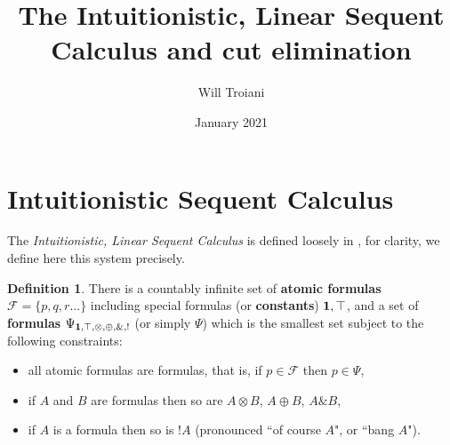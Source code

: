 \documentclass[12pt]{article}
\title{The Intuitionistic, Linear Sequent Calculus and cut elimination}
\author{Will Troiani}
\date{January 2021}
\theoremstyle{plain}
\theoremstyle{definition}
\newtheorem{defn}[thm]{Definition} %
\newcommand{\scr}[1]{\mathscr{#1}}
\begin{document}
\maketitle
\tableofcontents

\section{Intuitionistic Sequent Calculus}\label{Sec:intuitionistic_linear_sequent_calculus}
The \emph{Intuitionistic, Linear Sequent Calculus} is defined loosely in \cite[\S 11.1.2]{blind}, for clarity, we define here this system precisely.

\begin{defn}
There is a countably infinite set of \textbf{atomic formulas} $\scr{F} = \lbrace p,q,r\hdots \rbrace$ including special formulas (or \textbf{constants}) $\bold{1}, \top$, and a set of \textbf{formulas} $\Psi_{\bold{1},\top,\otimes, \oplus, \&, !}$ (or simply $\Psi$) which is the smallest set subject to the following constraints:
\begin{itemize}
    \item all atomic formulas are formulas, that is, if $p \in \scr{F}$ then $p \in \Psi$,
    \item if $A$ and $B$ are formulas then so are $A \otimes B$, $A \oplus B$, $A \& B$,
    \item if $A$ is a formula then so is $!A$ (pronounced ``of course $A$", or ``bang $A$").
\end{itemize}
\end{defn}
\end{document}
